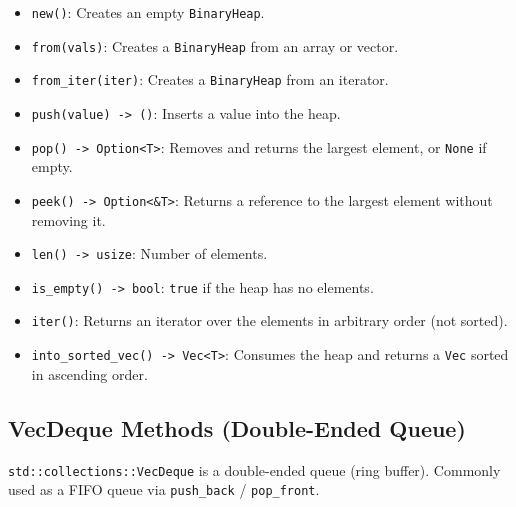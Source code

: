 \documentclass[
  11pt,
]{article}
\providecommand{\tightlist}{%
  \setlength{\itemsep}{0pt}\setlength{\parskip}{0pt}}
\begin{document}
\begin{itemize}
\tightlist
\item
  \texttt{new()}: Creates an empty \texttt{BinaryHeap}.
\item
  \texttt{from(vals)}: Creates a \texttt{BinaryHeap} from an array or
  vector.
\item
  \texttt{from\_iter(iter)}: Creates a \texttt{BinaryHeap} from an
  iterator.
\item
  \texttt{push(value)\ -\textgreater{}\ ()}: Inserts a value into the
  heap.
\item
  \texttt{pop()\ -\textgreater{}\ Option\textless{}T\textgreater{}}:
  Removes and returns the largest element, or \texttt{None} if empty.
\item
  \texttt{peek()\ -\textgreater{}\ Option\textless{}\&T\textgreater{}}:
  Returns a reference to the largest element without removing it.
\item
  \texttt{len()\ -\textgreater{}\ usize}: Number of elements.
\item
  \texttt{is\_empty()\ -\textgreater{}\ bool}: \texttt{true} if the heap
  has no elements.
\item
  \texttt{iter()}: Returns an iterator over the elements in arbitrary
  order (not sorted).
\item
  \texttt{into\_sorted\_vec()\ -\textgreater{}\ Vec\textless{}T\textgreater{}}:
  Consumes the heap and returns a \texttt{Vec} sorted in ascending
  order.
\end{itemize}

\subsection{VecDeque Methods (Double-Ended
Queue)}\label{vecdeque-methods-double-ended-queue}

\texttt{std::collections::VecDeque} is a double-ended queue (ring
buffer). Commonly used as a FIFO queue via \texttt{push\_back} /
\texttt{pop\_front}.
\end{document}
